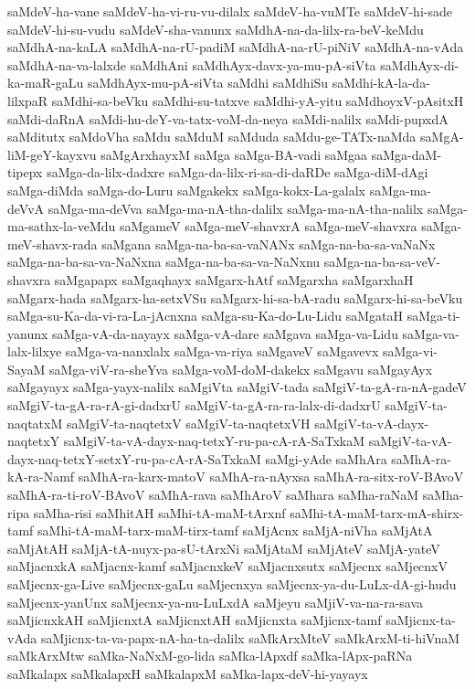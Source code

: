 {saMdeV-ha-vane
saMdeV-ha-vi-ru-vu-dilalx
saMdeV-ha-vuMTe
saMdeV-hi-sade
saMdeV-hi-su-vudu
saMdeV-sha-vanunx
saMdhA-na-da-lilx-ra-beV-keMdu
saMdhA-na-kaLA
saMdhA-na-rU-padiM
saMdhA-na-rU-piNiV
saMdhA-na-vAda
saMdhA-na-va-lalxde
saMdhAni
saMdhAyx-davx-ya-mu-pA-siVta
saMdhAyx-di-ka-maR-gaLu
saMdhAyx-mu-pA-siVta
saMdhi
saMdhiSu
saMdhi-kA-la-da-lilxpaR
saMdhi-sa-beVku
saMdhi-su-tatxve
saMdhi-yA-yitu
saMdhoyxV-pAsitxH
saMdi-daRnA
saMdi-hu-deY-va-tatx-voM-da-neya
saMdi-nalilx
saMdi-pupxdA
saMditutx
saMdoVha
saMdu
saMduM
saMduda
saMdu-ge-TATx-naMda
saMgA-liM-geY-kayxvu
saMgArxhayxM
saMga
saMga-BA-vadi
saMgaa
saMga-daM-tipepx
saMga-da-lilx-dadxre
saMga-da-lilx-ri-sa-di-daRDe
saMga-diM-dAgi
saMga-diMda
saMga-do-Luru
saMgakekx
saMga-kokx-La-galalx
saMga-ma-deVvA
saMga-ma-deVva
saMga-ma-nA-tha-dalilx
saMga-ma-nA-tha-nalilx
saMga-ma-sathx-la-veMdu
saMgameV
saMga-meV-shavxrA
saMga-meV-shavxra
saMga-meV-shavx-rada
saMgana
saMga-na-ba-sa-vaNANx
saMga-na-ba-sa-vaNaNx
saMga-na-ba-sa-va-NaNxna
saMga-na-ba-sa-va-NaNxnu
saMga-na-ba-sa-veV-shavxra
saMgapapx
saMgaqhayx
saMgarx-hAtf
saMgarxha
saMgarxhaH
saMgarx-hada
saMgarx-ha-setxVSu
saMgarx-hi-sa-bA-radu
saMgarx-hi-sa-beVku
saMga-su-Ka-da-vi-ra-La-jAcnxna
saMga-su-Ka-do-Lu-Lidu
saMgataH
saMga-ti-yanunx
saMga-vA-da-nayayx
saMga-vA-dare
saMgava
saMga-va-Lidu
saMga-va-lalx-lilxye
saMga-va-nanxlalx
saMga-va-riya
saMgaveV
saMgavevx
saMga-vi-SayaM
saMga-viV-ra-sheYva
saMga-voM-doM-dakekx
saMgavu
saMgayAyx
saMgayayx
saMga-yayx-nalilx
saMgiVta
saMgiV-tada
saMgiV-ta-gA-ra-nA-gadeV
saMgiV-ta-gA-ra-rA-gi-dadxrU
saMgiV-ta-gA-ra-ra-lalx-di-dadxrU
saMgiV-ta-naqtatxM
saMgiV-ta-naqtetxV
saMgiV-ta-naqtetxVH
saMgiV-ta-vA-dayx-naqtetxY
saMgiV-ta-vA-dayx-naq-tetxY-ru-pa-cA-rA-SaTxkaM
saMgiV-ta-vA-dayx-naq-tetxY-setxY-ru-pa-cA-rA-SaTxkaM
saMgi-yAde
saMhAra
saMhA-ra-kA-ra-Namf
saMhA-ra-karx-matoV
saMhA-ra-nAyxsa
saMhA-ra-sitx-roV-BAvoV
saMhA-ra-ti-roV-BAvoV
saMhA-rava
saMhAroV
saMhara
saMha-raNaM
saMha-ripa
saMha-risi
saMhitAH
saMhi-tA-maM-tArxnf
saMhi-tA-maM-tarx-mA-shirx-tamf
saMhi-tA-maM-tarx-maM-tirx-tamf
saMjAcnx
saMjA-niVha
saMjAtA
saMjAtAH
saMjA-tA-nuyx-pa-sU-tArxNi
saMjAtaM
saMjAteV
saMjA-yateV
saMjacnxkA
saMjacnx-kamf
saMjacnxkeV
saMjacnxsutx
saMjecnx
saMjecnxV
saMjecnx-ga-Live
saMjecnx-gaLu
saMjecnxya
saMjecnx-ya-du-LuLx-dA-gi-hudu
saMjecnx-yanUnx
saMjecnx-ya-nu-LuLxdA
saMjeyu
saMjiV-va-na-ra-sava
saMjicnxkAH
saMjicnxtA
saMjicnxtAH
saMjicnxta
saMjicnx-tamf
saMjicnx-ta-vAda
saMjicnx-ta-va-papx-nA-ha-ta-dalilx
saMkArxMteV
saMkArxM-ti-hiVnaM
saMkArxMtw
saMka-NaNxM-go-lida
saMka-lApxdf
saMka-lApx-paRNa
saMkalapx
saMkalapxH
saMkalapxM
saMka-lapx-deV-hi-yayayx
}
